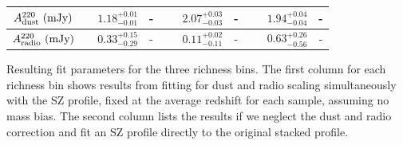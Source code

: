 \documentclass[a4paper,fleqn,usenatbib]{mnras}
\begin{document}
\begin{table}
\begin{threeparttable}
\begin{tabular}{|*{10}{c|}}
    $A^{220}_{\rm dust} \ (\rm mJy)$ & & $1.18^{+0.01}_{-0.01}$ & - & \ & $2.07^{+0.03}_{-0.03}$ & - & \ & $1.94^{+0.04}_{-0.04}$ & - \\ \hline
    

    $A^{220}_{\rm radio} \ (\rm mJy)$ & & $0.33^{+0.15}_{-0.29}$ & - & \ & $0.11^{+0.02}_{-0.11}$ & - & \ & $0.63^{+0.26}_{-0.56}$ & - \\ \hline
    
  \end{tabular}
  \begin{tablenotes}
	\item Resulting fit parameters for the three richness bins. 
	The first column for each richness bin shows results from fitting for dust and radio scaling simultaneously with the SZ profile, fixed at the average redshift for each sample, assuming no  mass bias. 
	The second column lists the results if we neglect the dust and radio correction and fit an SZ profile directly to the original stacked profile. 
  \end{tablenotes}
  \end{threeparttable}
\label{table:mcmcfitparam}
\end{table}
\end{document}
